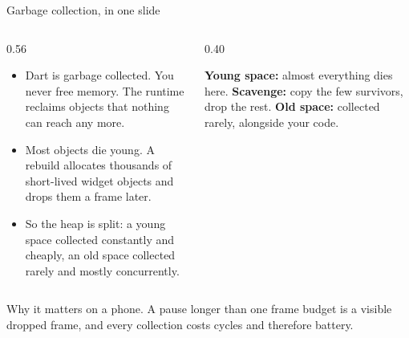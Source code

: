 \documentclass[10pt,aspectratio=169,t]{beamer}
\begin{document}
\begin{frame}[eyebrow=How code runs]{Garbage collection, in one slide}
  \vskip 2mm
  \begin{columns}[T]
    \begin{column}{0.56\textwidth}
      \begin{itemize}
        \item Dart is garbage collected. You never free memory. The runtime reclaims objects that nothing can reach any more.
        \item Most objects die young. A rebuild allocates thousands of short-lived widget objects and drops them a frame later.
        \item So the heap is split: a young space collected constantly and cheaply, an old space collected rarely and mostly concurrently.
      \end{itemize}
    \end{column}
    \begin{column}{0.40\textwidth}
      \begin{hint}
        \textbf{Young space:} almost everything dies here. \textbf{Scavenge:} copy the few survivors, drop the rest. \textbf{Old space:} collected rarely, alongside your code.
      \end{hint}
    \end{column}
  \end{columns}
  \begin{takeaway}{Why it matters on a phone.}
    A pause longer than one frame budget is a visible dropped frame, and every collection costs cycles and therefore battery.
  \end{takeaway}
\end{frame}
\end{document}
